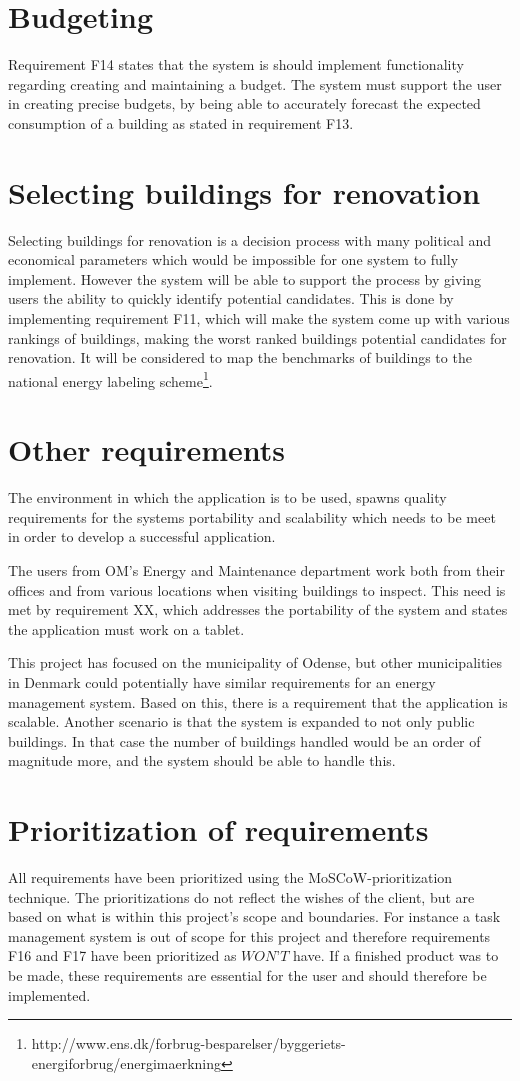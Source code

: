 \section{Budgeting}
Requirement F14 states that the system is should implement functionality regarding creating and maintaining a budget. The system must support the user in creating precise budgets, by being able to accurately forecast the expected consumption of a building as stated in requirement F13.
\section{Selecting buildings for renovation}
Selecting buildings for renovation is a decision process with many political and economical parameters which would be impossible for one system to fully implement. However the system will be able to support the process by giving users the ability to quickly identify potential candidates. This is done by implementing requirement F11, which will make the system come up with various rankings of buildings, making the worst ranked buildings potential candidates for renovation. It will be considered to map the benchmarks of buildings to the national energy labeling scheme\footnote{ http://www.ens.dk/forbrug-besparelser/byggeriets-energiforbrug/energimaerkning }.
\section{Other requirements}
The environment in which the application is to be used, spawns quality requirements for the systems portability and scalability which needs to be meet in order to develop a successful application. 

The users from OM’s Energy and Maintenance department work both from their offices and from various locations when visiting buildings to inspect. This need is met by requirement XX, which addresses the portability of the system and states the application must work on a tablet. 

This project has focused on the municipality of Odense, but other municipalities in Denmark could potentially have similar requirements for an energy management system. Based on this, there is a requirement that the application is scalable. Another scenario is that the system is expanded to not only public buildings. In that case the number of buildings handled would be an order of magnitude more, and the system should be able to handle this. 
\section{Prioritization of requirements}
All requirements have been prioritized using the MoSCoW-prioritization technique. The prioritizations do not reflect the wishes of the client,  but are based on what is within this project's scope and boundaries. For instance a task management system is out of scope for this project and therefore requirements F16 and F17 have been prioritized as $WON’T$ have. If a finished product was to be made, these requirements are essential for the user and should therefore be implemented.
